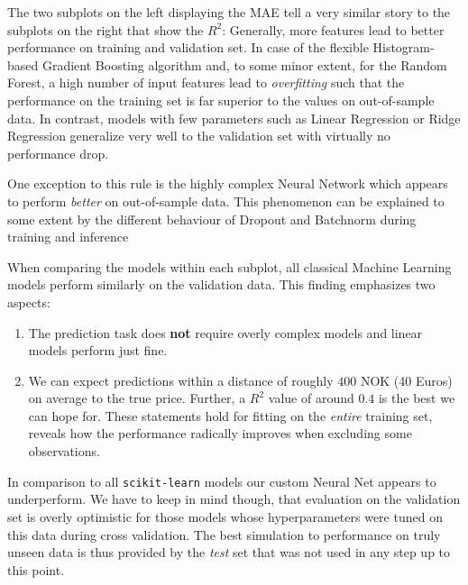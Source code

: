 The two subplots on the left displaying the MAE tell a very similar story to the subplots on the right that show the $R^2$:
Generally, more features lead to better performance on training and validation set.
In case of the flexible Histogram-based Gradient Boosting algorithm and, to some minor extent, for the Random Forest, a high number of input features lead to \emph{overfitting} such that the performance on the training set is far superior to the values on out-of-sample data.
In contrast, models with few parameters such as Linear Regression or Ridge Regression generalize very well to the validation set with virtually no performance drop.

One exception to this rule is the highly complex Neural Network which appears to perform \emph{better} on out-of-sample data.
This phenomenon can be explained to some extent by the different behaviour of Dropout and Batchnorm during training and inference

When comparing the models within each subplot, all classical Machine Learning models perform similarly on the validation data.
This finding emphasizes two aspects:
\begin{enumerate}
  \item The prediction task does \textbf{not} require overly complex models and linear models perform just fine.
  \item We can expect predictions within a distance of roughly $400$ NOK (40 Euros) on average to the true price.
        Further, a $R^2$ value of around $0.4$ is the best we can hope for.
        These statements hold for fitting on the \emph{entire} training set,  reveals how the performance radically improves when excluding some observations.
\end{enumerate}
In comparison to all \texttt{scikit-learn} models our custom Neural Net appears to underperform.
We have to keep in mind though, that evaluation on the validation set is overly optimistic for those models whose hyperparameters were tuned on this data during cross validation.
The best simulation to performance on truly unseen data is thus provided by the \emph{test} set that was not used in any step up to this point.

